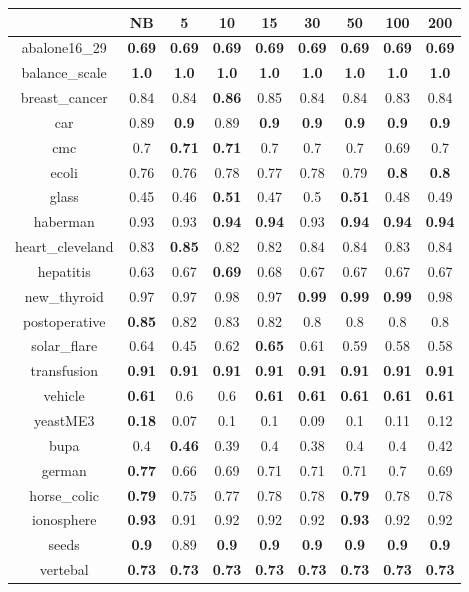 \documentclass{article}%
\begin{document}
\begin{tabular}{c|cccccccc}%
\hline%
&NB&5&10&15&30&50&100&200\\%
\hline%
abalone16\_29&\textbf{0.69}&\textbf{0.69}&\textbf{0.69}&\textbf{0.69}&\textbf{0.69}&\textbf{0.69}&\textbf{0.69}&\textbf{0.69}\\%
\hline%
balance\_scale&\textbf{1.0}&\textbf{1.0}&\textbf{1.0}&\textbf{1.0}&\textbf{1.0}&\textbf{1.0}&\textbf{1.0}&\textbf{1.0}\\%
\hline%
breast\_cancer&0.84&0.84&\textbf{0.86}&0.85&0.84&0.84&0.83&0.84\\%
\hline%
car&0.89&\textbf{0.9}&0.89&\textbf{0.9}&\textbf{0.9}&\textbf{0.9}&\textbf{0.9}&\textbf{0.9}\\%
\hline%
cmc&0.7&\textbf{0.71}&\textbf{0.71}&0.7&0.7&0.7&0.69&0.7\\%
\hline%
ecoli&0.76&0.76&0.78&0.77&0.78&0.79&\textbf{0.8}&\textbf{0.8}\\%
\hline%
glass&0.45&0.46&\textbf{0.51}&0.47&0.5&\textbf{0.51}&0.48&0.49\\%
\hline%
haberman&0.93&0.93&\textbf{0.94}&\textbf{0.94}&0.93&\textbf{0.94}&\textbf{0.94}&\textbf{0.94}\\%
\hline%
heart\_cleveland&0.83&\textbf{0.85}&0.82&0.82&0.84&0.84&0.83&0.84\\%
\hline%
hepatitis&0.63&0.67&\textbf{0.69}&0.68&0.67&0.67&0.67&0.67\\%
\hline%
new\_thyroid&0.97&0.97&0.98&0.97&\textbf{0.99}&\textbf{0.99}&\textbf{0.99}&0.98\\%
\hline%
postoperative&\textbf{0.85}&0.82&0.83&0.82&0.8&0.8&0.8&0.8\\%
\hline%
solar\_flare&0.64&0.45&0.62&\textbf{0.65}&0.61&0.59&0.58&0.58\\%
\hline%
transfusion&\textbf{0.91}&\textbf{0.91}&\textbf{0.91}&\textbf{0.91}&\textbf{0.91}&\textbf{0.91}&\textbf{0.91}&\textbf{0.91}\\%
\hline%
vehicle&\textbf{0.61}&0.6&0.6&\textbf{0.61}&\textbf{0.61}&\textbf{0.61}&\textbf{0.61}&\textbf{0.61}\\%
\hline%
yeastME3&\textbf{0.18}&0.07&0.1&0.1&0.09&0.1&0.11&0.12\\%
\hline%
bupa&0.4&\textbf{0.46}&0.39&0.4&0.38&0.4&0.4&0.42\\%
\hline%
german&\textbf{0.77}&0.66&0.69&0.71&0.71&0.71&0.7&0.69\\%
\hline%
horse\_colic&\textbf{0.79}&0.75&0.77&0.78&0.78&\textbf{0.79}&0.78&0.78\\%
\hline%
ionosphere&\textbf{0.93}&0.91&0.92&0.92&0.92&\textbf{0.93}&0.92&0.92\\%
\hline%
seeds&\textbf{0.9}&0.89&\textbf{0.9}&\textbf{0.9}&\textbf{0.9}&\textbf{0.9}&\textbf{0.9}&\textbf{0.9}\\%
\hline%
vertebal&\textbf{0.73}&\textbf{0.73}&\textbf{0.73}&\textbf{0.73}&\textbf{0.73}&\textbf{0.73}&\textbf{0.73}&\textbf{0.73}\\%
\hline%
\end{tabular}
\end{document}
